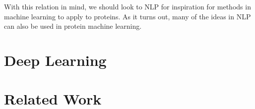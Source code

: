 With this relation in mind, we should look to NLP for inspiration for methods in machine learning to apply to proteins. As it turns out, many of the ideas in NLP can also be used in protein machine learning.

\section{Deep Learning}


\section{Related Work}










